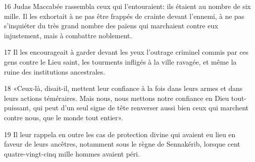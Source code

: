 
16 Judas Maccabée rassembla ceux qui l’entouraient: ils étaient au nombre de six mille. Il les exhortait à ne pas être frappés de crainte devant l’ennemi, à ne pas s’inquiéter du très grand nombre des païens qui marchaient contre eux injustement, mais à combattre noblement.

17 Il les encourageait à garder devant les yeux l’outrage criminel commis par ces gens contre le Lieu saint, les tourments infligés à la ville ravagée, et même la ruine des institutions ancestrales.

18 «Ceux-là, disait-il, mettent leur confiance à la fois dans leurs armes et dans leurs actions téméraires. Mais nous, nous mettons notre confiance en Dieu tout-puissant, qui peut d’un seul signe de tête renverser aussi bien ceux qui marchent contre nous, que le monde tout entier».

19 Il leur rappela en outre les cas de protection divine qui avaient eu lieu en faveur de leurs ancêtres, notamment sous le règne de Sennakérib, lorsque cent quatre-vingt-cinq mille hommes avaient péri.
